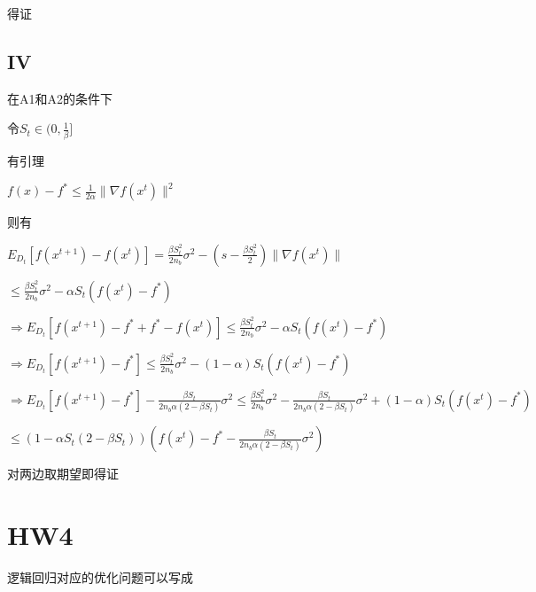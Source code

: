 \documentclass{xjtureport}
\begin{document}
得证
\subsection{IV}
在A1和A2的条件下

令$S_{t} \in (0,\frac{1}{\beta}]$

有引理

$f(x) - f^* \leq \frac{1}{2\alpha} \|\nabla f(x^t) \|^2$

则有

$E_{D_{t}}[f(x^{t+1}) - f(x^t)] = \frac{\beta S_{t}^{2}}{2n_{b}} \sigma^2 - (s - \frac{\beta S_{t}^{2}}{2})\|\nabla f(x^t) \|$

$\leq \frac{\beta S_{t}^{2}}{2n_{b}} \sigma^2 - \alpha S_{t}(f(x^t) - f^*)$

$\Rightarrow E_{D_{t}}[f(x^{t+1}) - f^* + f^* - f(x^t)] \leq \frac{\beta S_{t}^{2}}{2n_{b}} \sigma^2 - \alpha S_{t}(f(x^t) - f^*)$

$\Rightarrow E_{D_{t}}[f(x^{t+1}) - f^*] \leq \frac{\beta S_{t}^{2}}{2n_{b}} \sigma^2 - (1-\alpha) S_{t}(f(x^t) - f^*)$

$\Rightarrow E_{D_{t}}[f(x^{t+1}) - f^*] - \frac{\beta S_{t}}{2n_{b}\alpha (2-\beta S_{t})} \sigma^2 \leq \frac{\beta S_{t}^{2}}{2n_{b}} \sigma^2 - \frac{\beta S_{t}}{2n_{b}\alpha (2-\beta S_{t})} \sigma^2 + (1-\alpha) S_{t}(f(x^t) - f^*)$

$\leq (1- \alpha S_{t}(2 - \beta S_{t}))(f(x^t) - f^* - \frac{\beta S_{t}}{2n_{b}\alpha (2-\beta S_{t})} \sigma^2)$

对两边取期望即得证
\section{HW4}
逻辑回归对应的优化问题可以写成
\end{document}
